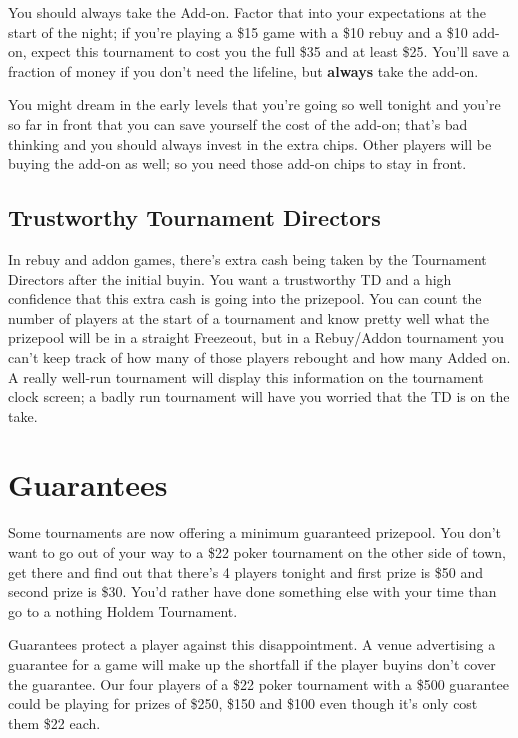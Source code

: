 You should always take the Add-on. Factor that into your expectations
at the start of the night; if you're playing a \$15 game with a \$10
rebuy and a \$10 add-on, expect this tournament to cost you the full
\$35 and at least \$25. You'll save a fraction of money if you don't
need the lifeline, but \textbf{always} take the add-on.

You might dream in the early levels that you're going so well 
tonight and you're so far in front that you can save yourself
the cost of the add-on; that's bad thinking and you should always
invest in the extra chips. Other players will be buying the add-on
as well; so you need those add-on chips to stay in front.

\subsection*{Trustworthy Tournament Directors}

In rebuy and addon games, there's extra cash being taken by
the Tournament Directors after the initial buyin. You want
a trustworthy TD and a high confidence that this extra cash is
going into the prizepool. You can count the number of players
at the start of a tournament and know pretty well what the prizepool
will be in a straight Freezeout, but in a Rebuy/Addon tournament
you can't keep track of how many of those players rebought and how
many Added on. A really well-run tournament will display this
information on the tournament clock screen; a badly run tournament
will have you worried that the TD is on the take.

\section{Guarantees}

Some tournaments are now offering a minimum guaranteed prizepool. You
don't want to go out of your way to a \$22 poker tournament on the
other side of town, get there and find out that there's 4 players tonight
and first prize is \$50 and second prize is \$30. You'd rather have
done something else with your time than go to a nothing Holdem Tournament.

Guarantees protect a player against this disappointment. A venue
advertising a guarantee for a game will make up the shortfall if the
player buyins don't cover the guarantee. Our four players of a \$22
poker tournament with a \$500 guarantee could be playing for prizes
of \$250, \$150 and \$100 even though it's only cost them \$22 each.

